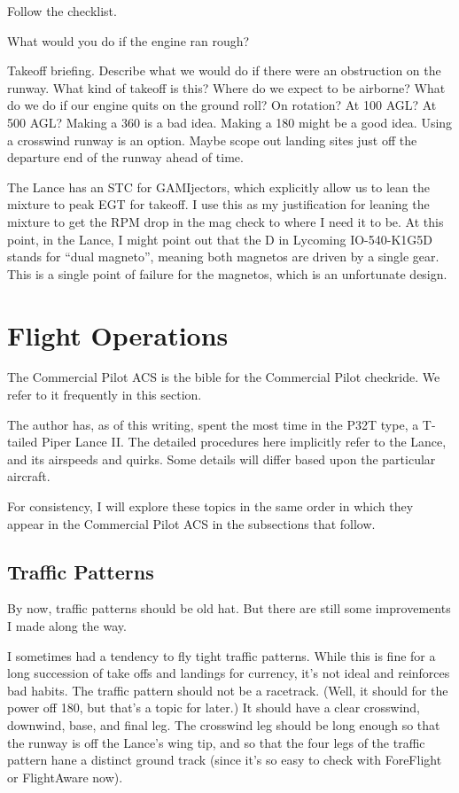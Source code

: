 Follow the checklist.

What would you do if the engine ran rough?

Takeoff briefing. Describe what we would do if there were an obstruction on the runway. What kind of takeoff is this? Where do we expect to be airborne? What do we do if our engine quits on the ground roll? On rotation? At 100 AGL? At 500 AGL? Making a 360 is a bad idea. Making a 180 might be a good idea. Using a crosswind runway is an option. Maybe scope out landing sites just off the departure end of the runway ahead of time.

The Lance has an STC for GAMIjectors, which explicitly allow us to lean the mixture to peak EGT for takeoff. I use this as my justification for leaning the mixture to get the RPM drop in the mag check to where I need it to be. At this point, in the Lance, I might point out that the D in Lycoming IO-540-K1G5D stands for ``dual magneto'', meaning both magnetos are driven by a single gear. This is a single point of failure for the magnetos, which is an unfortunate design.

\section{Flight Operations}

The Commercial Pilot ACS \cite{acs-commercial} is the bible for the Commercial Pilot checkride. We refer to it frequently in this section.

The author has, as of this writing, spent the most time in the P32T type, a T-tailed Piper Lance II. The detailed procedures here implicitly refer to the Lance, and its airspeeds and quirks. Some details will differ based upon the particular aircraft.

For consistency, I will explore these topics in the same order in which they appear in the Commercial Pilot ACS in the subsections that follow.

\subsection{Traffic Patterns}

By now, traffic patterns should be old hat. But there are still some improvements I made along the way.

I sometimes had a tendency to fly tight traffic patterns. While this is fine for a long succession of take offs and landings for currency, it's not ideal and reinforces bad habits. The traffic pattern should not be a racetrack. (Well, it should for the power off 180, but that's a topic for later.) It should have a clear crosswind, downwind, base, and final leg. The crosswind leg should be long enough so that the runway is off the Lance's wing tip, and so that the four legs of the traffic pattern hane a distinct ground track (since it's so easy to check with ForeFlight or FlightAware now).

